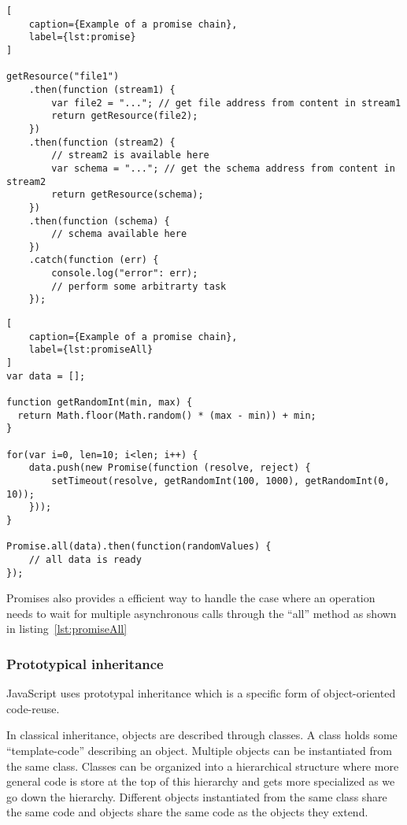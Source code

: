 \begin{lstlisting}[
    caption={Example of a promise chain},
    label={lst:promise}
]

getResource("file1")
    .then(function (stream1) {
        var file2 = "..."; // get file address from content in stream1
        return getResource(file2);
    })
    .then(function (stream2) {
        // stream2 is available here
        var schema = "..."; // get the schema address from content in stream2
        return getResource(schema);
    })
    .then(function (schema) {
        // schema available here
    })
    .catch(function (err) {
        console.log("error": err);
        // perform some arbitrarty task
    });

\end{lstlisting}


\begin{lstlisting}[
    caption={Example of a promise chain},
    label={lst:promiseAll}
]
var data = [];

function getRandomInt(min, max) {
  return Math.floor(Math.random() * (max - min)) + min;
}

for(var i=0, len=10; i<len; i++) {
    data.push(new Promise(function (resolve, reject) {
        setTimeout(resolve, getRandomInt(100, 1000), getRandomInt(0, 10));
    }));
}

Promise.all(data).then(function(randomValues) {
    // all data is ready
});

\end{lstlisting}

Promises also provides a efficient way to handle the case where an operation needs to wait for multiple asynchronous calls through the ``all'' method as shown in listing~\ref{lst:promiseAll}

\subsubsection{Prototypical inheritance}

JavaScript uses prototypal inheritance which is a specific form of object-oriented code-reuse.

In classical inheritance, objects are described through classes. A class holds some ``template-code'' describing an object. Multiple objects can be instantiated from the same class. Classes can be organized into a hierarchical structure where more general code is store at the top of this hierarchy and gets more specialized as we go down the hierarchy. Different objects instantiated from the same class share the same code and objects share the same code as the objects they extend.

